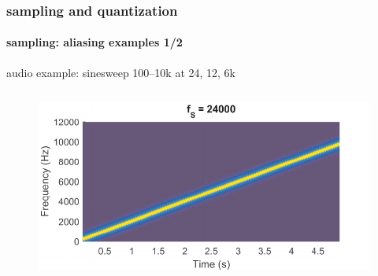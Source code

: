 		\begin{frame}\frametitle{sampling and quantization}\framesubtitle{sampling: aliasing examples 1/2}
			\vspace{-3mm}
			audio example: sinesweep 100--10k at 24, 12, 6k
            \vspace{-3mm}
			\begin{columns}
				\vspace{-5mm}
				\begin{figure}
					\includegraphics[scale=.35]{graph/sinealiasing_1}
				\end{figure}
				

\end{columns}
\end{frame}
